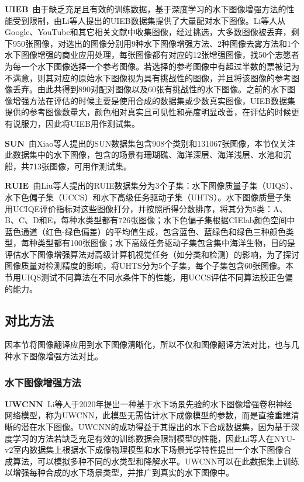 $\mathbf{UIEB}$~由于缺乏充足且有效的训练数据，基于深度学习的水下图像增强方法的性能受到限制，由Li等人\cite{li2019underwater}提出的UIEB数据集提供了大量配对水下图像。Li等人从Google、YouTube和其它相关文献中收集图像，经过挑选，大多数图像被丢弃，剩下950张图像，对选出的图像分别用9种水下图像增强方法、2种图像去雾方法和1个水下图像增强的商业应用处理，每张图像都有对应的12张增强图像，找50个志愿者为每一个水下图像选择一个参考图像。若选择的参考图像中有超过半数的票被记为不满意，则其对应的原始水下图像视为具有挑战性的图像，并且将该图像的参考图像丢弃。由此共得到890对配对图像以及60张有挑战性的水下图像。之前的水下图像增强方法在评估的时候主要是使用合成的数据集或少数真实图像，UIEB数据集提供的参考图像数量大，颜色相对真实且可见性和亮度明显改善，在评估的时候更有说服力，因此将UIEB用作测试集。

$\mathbf{SUN}$~由Xiao等人\cite{xiao2016sun}提出的SUN数据集包含908个类别和131067张图像，本节仅关注此数据集中的水下图像，包含的场景有珊瑚礁、海洋深层、海洋浅层、水池和沉船，共713张图像，可用作测试集。

$\mathbf{RUIE}$~由Liu等人\cite{liu2019real}提出的RUIE数据集分为3个子集：水下图像质量子集（UIQS）、水下色偏子集（UCCS）和水下高级任务驱动子集（UHTS）。水下图像质量子集用UCIQE评价指标对这些图像打分，并按照所得分数排序，将其分为5类：A、B、C、D和E，每种水类型都有726张图像；水下色偏子集根据CIElab颜色空间中蓝色通道（红色-绿色偏差）的平均值生成，包含蓝色、蓝绿色和绿色三种颜色类型，每种类型都有100张图像；水下高级任务驱动子集包含集中海洋生物，目的是评估水下图像增强算法对高级计算机视觉任务（如分类和检测）的影响，为了探讨图像质量对检测精度的影响，将UHTS分为5个子集，每个子集包含60张图像。本节用UIQS测试不同算法在不同水条件下的性能，用UCCS评估不同算法校正色偏的能力。

\subsection{对比方法}

因本节将图像翻译应用到水下图像清晰化，所以不仅和图像翻译方法对比，也与几种水下图像增强方法对比。

\subsubsection{水下图像增强方法}

$\mathbf{UWCNN}$~Li等人\cite{li2020underwater}于2020年提出一种基于水下场景先验的水下图像增强卷积神经网络模型，称为UWCNN，此模型无需估计水下成像模型的参数，而是直接重建清晰的潜在水下图像。UWCNN的成功得益于其提出的水下合成数据集，因为基于深度学习的方法若缺乏充足有效的训练数据会限制模型的性能，因此Li等人在NYU-v2室内数据集\cite{silberman2012indoor}上根据水下成像物理模型和水下场景光学特性提出一个水下图像合成算法，可以模拟多种不同的水类型和降解水平。UWCNN可以在此数据集上训练以增强每种合成的水下场景类型，并推广到真实的水下图像中。

